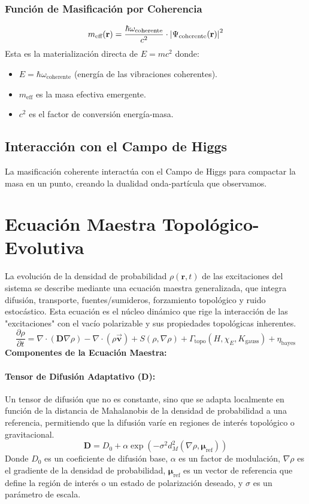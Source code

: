 \documentclass{book}
\newcommand{\bvec}[1]{\vec{\mathbf{#1}}} %
\begin{document}
\subsubsection{Función de Masificación por Coherencia}
\begin{equation}
m_{\text{eff}}(\mathbf{r}) = \frac{\hbar\omega_{\text{coherente}}}{c^2} \cdot \abs{\Psi_{\text{coherente}}(\mathbf{r})}^2
\end{equation}
Esta es la materialización directa de $E=mc^2$ donde:
\begin{itemize}
    \item $E = \hbar\omega_{\text{coherente}}$ (energía de las vibraciones coherentes).
    \item $m_{\text{eff}}$ es la masa efectiva emergente.
    \item $c^2$ es el factor de conversión energía-masa.
\end{itemize}

\subsection{Interacción con el Campo de Higgs}
La masificación coherente interactúa con el Campo de Higgs para compactar la masa en un punto, creando la dualidad onda-partícula que observamos.

\section{Ecuación Maestra Topológico-Evolutiva}
La evolución de la densidad de probabilidad $\rho(\mathbf{r},t)$ de las excitaciones del sistema se describe mediante una ecuación maestra generalizada, que integra difusión, transporte, fuentes/sumideros, forzamiento topológico y ruido estocástico. Esta ecuación es el núcleo dinámico que rige la interacción de las "excitaciones" con el vacío polarizable y sus propiedades topológicas inherentes.
\begin{equation}
    \frac{\partial\rho}{\partial t}=\nabla\cdot(\mathbf{D}\nabla\rho)-\nabla\cdot(\rho\bvec{v})+S(\rho,\nabla\rho)+\Gamma_{\text{topo}}(H,\chi_E,K_{\text{gauss}})+\eta_{\text{bayes}}
\end{equation}
\textbf{Componentes de la Ecuación Maestra:}

\paragraph{Tensor de Difusión Adaptativo ($\mathbf{D}$):} Un tensor de difusión que no es constante, sino que se adapta localmente en función de la distancia de Mahalanobis de la densidad de probabilidad a una referencia, permitiendo que la difusión varíe en regiones de interés topológico o gravitacional.
\begin{equation}
    \mathbf{D}=D_0+\alpha\exp(-\sigma^2d_M^2(\nabla\rho,\boldsymbol{\mu}_{\text{ref}}))
\end{equation}
Donde $D_0$ es un coeficiente de difusión base, $\alpha$ es un factor de modulación, $\nabla\rho$ es el gradiente de la densidad de probabilidad, $\boldsymbol{\mu}_{\text{ref}}$ es un vector de referencia que define la región de interés o un estado de polarización deseado, y $\sigma$ es un parámetro de escala.
\end{document}
